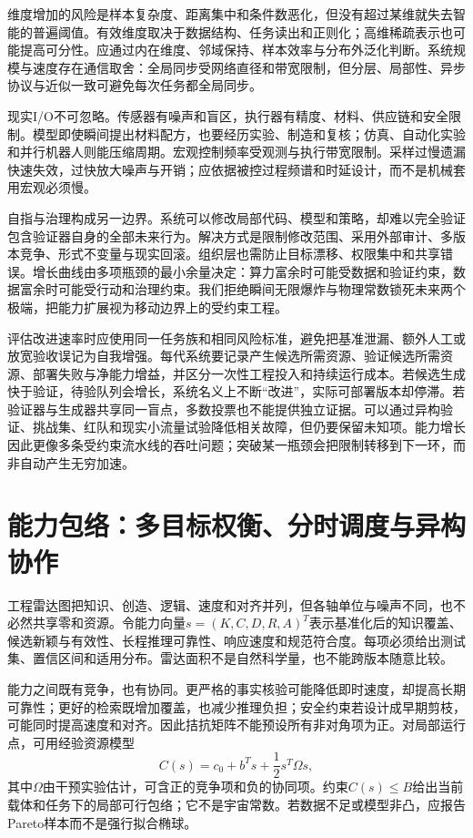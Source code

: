 维度增加的风险是样本复杂度、距离集中和条件数恶化，但没有超过某维就失去智能的普遍阈值。有效维度取决于数据结构、任务读出和正则化；高维稀疏表示也可能提高可分性。应通过内在维度、邻域保持、样本效率与分布外泛化判断。系统规模与速度存在通信取舍：全局同步受网络直径和带宽限制，但分层、局部性、异步协议与近似一致可避免每次任务都全局同步。

现实I/O不可忽略。传感器有噪声和盲区，执行器有精度、材料、供应链和安全限制。模型即使瞬间提出材料配方，也要经历实验、制造和复核；仿真、自动化实验和并行机器人则能压缩周期。宏观控制频率受观测与执行带宽限制。采样过慢遗漏快速失效，过快放大噪声与开销；应依据被控过程频谱和时延设计，而不是机械套用宏观必须慢。

自指与治理构成另一边界。系统可以修改局部代码、模型和策略，却难以完全验证包含验证器自身的全部未来行为。解决方式是限制修改范围、采用外部审计、多版本竞争、形式不变量与现实回滚。组织层也需防止目标漂移、权限集中和共享错误。增长曲线由多项瓶颈的最小余量决定：算力富余时可能受数据和验证约束，数据富余时可能受行动和治理约束。我们拒绝瞬间无限爆炸与物理常数锁死未来两个极端，把能力扩展视为移动边界上的受约束工程。

评估改进速率时应使用同一任务族和相同风险标准，避免把基准泄漏、额外人工或放宽验收误记为自我增强。每代系统要记录产生候选所需资源、验证候选所需资源、部署失败与净能力增益，并区分一次性工程投入和持续运行成本。若候选生成快于验证，待验队列会增长，系统名义上不断“改进”，实际可部署版本却停滞。若验证器与生成器共享同一盲点，多数投票也不能提供独立证据。可以通过异构验证、挑战集、红队和现实小流量试验降低相关故障，但仍要保留未知项。能力增长因此更像多条受约束流水线的吞吐问题；突破某一瓶颈会把限制转移到下一环，而非自动产生无穷加速。

\section{能力包络：多目标权衡、分时调度与异构协作}
\label{sec:topological_envelope_of_intelligence}

工程雷达图把知识、创造、逻辑、速度和对齐并列，但各轴单位与噪声不同，也不必然共享零和资源。令能力向量$s=(K,C,D,R,A)^T$表示基准化后的知识覆盖、候选新颖与有效性、长程推理可靠性、响应速度和规范符合度。每项必须给出测试集、置信区间和适用分布。雷达面积不是自然科学量，也不能跨版本随意比较。

能力之间既有竞争，也有协同。更严格的事实核验可能降低即时速度，却提高长期可靠性；更好的检索既增加覆盖，也减少推理负担；安全约束若设计成早期剪枝，可能同时提高速度和对齐。因此拮抗矩阵不能预设所有非对角项为正。对局部运行点，可用经验资源模型
\begin{equation}
C(s)=c_0+b^Ts+\frac12s^T\Omega s,
\end{equation}
其中$\Omega$由干预实验估计，可含正的竞争项和负的协同项。约束$C(s)\le B$给出当前载体和任务下的局部可行包络；它不是宇宙常数。若数据不足或模型非凸，应报告Pareto样本而不是强行拟合椭球。

